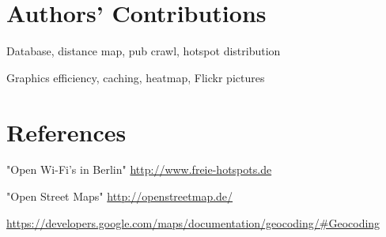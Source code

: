 \section*{Authors' Contributions}

\begin{description}
\setlength{\itemsep}{0pt}
  \item[Andreas Ergenzinger] Database, distance map, pub crawl, hotspot distribution
  \item[Josua Krause] Graphics efficiency, caching, heatmap, Flickr pictures
\end{description}

\section*{References}

\begin{description}
\setlength{\itemsep}{0pt}
\item[Wi-Fi Positions.] "Open Wi-Fi's in Berlin" 
  \url{http://www.freie-hotspots.de}
\item[OSM.] "Open Street Maps" 
  \url{http://openstreetmap.de/}
\item[Google Geocoding API.]
  \url{https://developers.google.com/maps/documentation/geocoding/#Geocoding}
\end{description}
